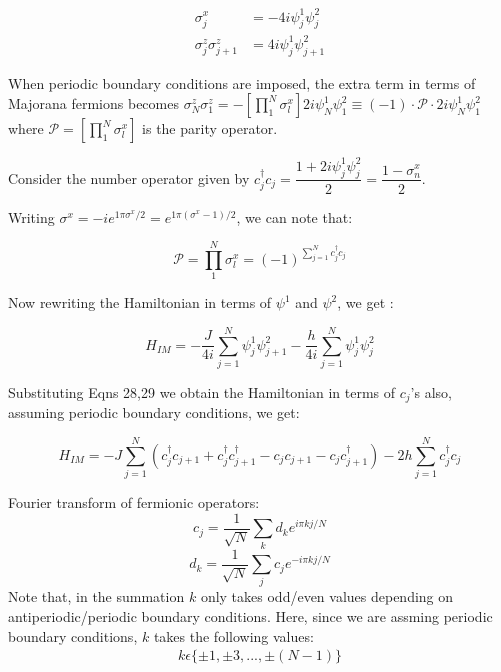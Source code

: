 \documentclass[11pt,a4paper]{article}
\begin{document}
	\begin{align}
	\sigma_{j}^{x} &= - 4i \psi^{1}_{j}\psi^{2}_{j}\\
	\sigma_{j}^{z}\sigma_{j+1}^{z} &=  4i \psi^{1}_{j}\psi^{2}_{j+1}
	\end{align}
	
	When periodic boundary conditions are imposed, the extra term in terms of Majorana fermions becomes $\sigma_{N}^z\sigma_{1}^z= -[\prod_{1}^N\sigma_{l}^x]2i\psi_{N}^1\psi_{1}^2 \equiv (-1)\cdot \mathcal{P}\cdot 2i\psi_{N}^1\psi_{1}^2 $ where $\mathcal{P} = [\prod_{1}^N\sigma_{l}^x]$ is the parity operator. 
	
	Consider the number operator given by $c_{j}^\dagger c_{j} = \dfrac{1+2i\psi_{j}^1\psi_{j}^2}{2} = \dfrac{1-\sigma_{n}^x}{2}$. 
	
	Writing $ \sigma^x =- i e^{1 \pi  \sigma^x/2} = e^{1\pi(\sigma^x-1) /2}  $, we can note that:
	
	\begin{equation}
	\mathcal{P} = \prod_{1}^N\sigma_{l}^x = (-1)^{\sum_{j=1}^N c_{j}^\dagger c_{j}}
	\end{equation}
	
	Now rewriting the Hamiltonian in terms of $\psi^{1}$ and $\psi^{2}$, we get :
	
		\begin{equation}
		H_{IM} = -\dfrac{J}{4i}\sum_{j=1}^{N} \psi_{j}^{1}\psi_{j+1}^{2} - \dfrac{h}{4i}\sum_{j=1}^{N} \psi_{j}^{1}\psi_{j}^{2}
		\end{equation}
		
		Substituting Eqns 28,29 we obtain the Hamiltonian in terms of $c_{j}$'s also, assuming periodic boundary conditions, we get:
		
		\begin{equation}
			H_{IM} = -J\sum_{j=1}^{N} (c_{j}^{\dagger}c_{j+1} + c_{j}^{\dagger}c_{j+1}^{\dagger}-c_{j}c_{j+1}-c_{j}c_{j+1}^{\dagger}) - 2h\sum_{j=1}^{N} c_{j}^{\dagger}c_{j}
		\end{equation}
	
     	Fourier transform of fermionic operators:
		\begin{equation}
		c_{j} = \dfrac{1}{\sqrt{N}}\sum_{k}d_{k} e^{i\pi kj/N}
		\end{equation}
		\begin{equation}
		d_{k} =  \dfrac{1}{\sqrt{N}}\sum_{j}c_{j} e^{-i\pi kj/N}
		\end{equation}
Note that, in the summation $k$ only takes odd/even values depending on antiperiodic/periodic boundary conditions. Here, since we are assming periodic boundary conditions, $k$ takes the following values:
\begin{align*}
k \epsilon \{\pm 1,\pm 3,...,\pm (N-1)\}
\end{align*}
	    
\end{document}
